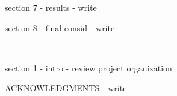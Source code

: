 section 7 - results
- write

section 8 - final consid
- write

----------------------------------

section 1 - intro
- review project organization

ACKNOWLEDGMENTS
- write
